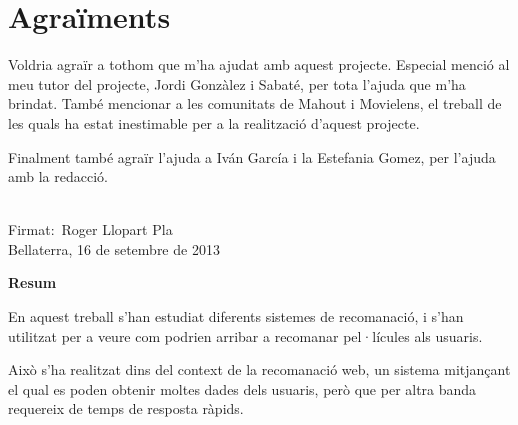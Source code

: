 \documentclass[a4paper,12pt,catalan]{book}
\begin{document}
\chapter*{Agraïments}

Voldria agraïr a tothom que m'ha ajudat amb aquest projecte. Especial menció al meu tutor del projecte, Jordi Gonzàlez i Sabaté, per tota l'ajuda que m'ha brindat. També mencionar a les comunitats de Mahout i Movielens, el treball de les quals ha estat inestimable per a la realització d'aquest projecte.

Finalment també agraïr l'ajuda a Iván García i la Estefania Gomez, per l'ajuda amb la redacció.

\tableofcontents

\newpage
{}
\pagestyle{headings}








\cleardoublepage
{}
{}
\printbibliography
\cleardoublepage

\pagestyle{plain} 
\vspace*{6cm} 
\begin{center} 
\begin{minipage}{4in} 
\parindent=0pt \vspace*{1in} 
\begin{center} 
\vrule width 3in height 0.4pt
\\Firmat:\ Roger Llopart Pla
\\ Bellaterra, 16 de setembre de 2013
\end{center} 
\end{minipage} 
\end{center} 

\newpage 

\thispagestyle{empty}

\vfill{}
{\par\centering \textbf{\large Resum}\large \par}

En aquest treball s'han estudiat diferents sistemes de recomanació, i s'han utilitzat per a veure com podrien arribar a recomanar pel·lícules als usuaris.

Això s'ha realitzat dins del context de la recomanació web, un sistema mitjançant el qual es poden obtenir moltes dades dels usuaris, però que per altra banda requereix de temps de resposta ràpids.
\end{document}
